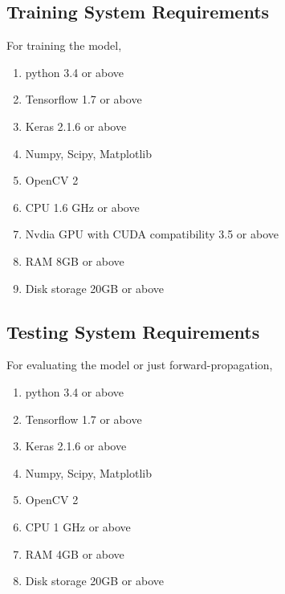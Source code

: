 \subsection{Training System Requirements} %
\label{sub:training_system_requirements}
For training the model,
\begin{enumerate}
    \item python 3.4 or above
    \item Tensorflow 1.7 or above
    \item Keras  2.1.6 or above
    \item Numpy, Scipy, Matplotlib
    \item OpenCV 2
    \item CPU 1.6 GHz or above
    \item Nvdia GPU with CUDA compatibility 3.5 or above
    \item RAM 8GB or above
    \item Disk storage 20GB or above
\end{enumerate}

\subsection{Testing System Requirements} %
\label{sub:Testing_system_requirements}
For evaluating the model or just forward-propagation,
\begin{enumerate}
    \item python 3.4 or above
    \item Tensorflow 1.7 or above
    \item Keras  2.1.6 or above
    \item Numpy, Scipy, Matplotlib
    \item OpenCV 2
    \item CPU 1 GHz or above
    \item RAM 4GB or above
    \item Disk storage 20GB or above
\end{enumerate}
